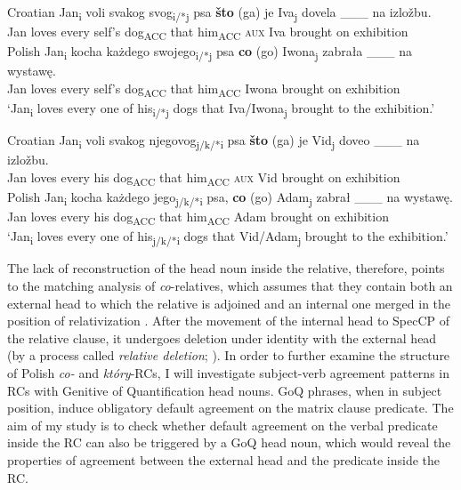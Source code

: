 \documentclass[output=paper]{langsci/langscibook}
\begin{document}
\ea%
    \label{ex:leska:15}
    \ea    Croatian
      \gll Jan\textsubscript{i} voli   svakog   svog\textsubscript{i/*j} psa   \textbf{što} (ga)   je   Iva\textsubscript{j} dovela \_\_\_ na izložbu. \\
           \textsubscript{} Jan   loves   every   self’s   dog\textsubscript{ACC}  that  him\textsubscript{ACC}  \textsc{aux}  Iva   brought on exhibition  \\
      \ex   Polish
      \gll  Jan\textsubscript{i} kocha   każdego   swojego\textsubscript{i/*j} psa   \textbf{co}   (go)   Iwona\textsubscript{j}    zabrała \_\_\_   na wystawę.       \\
            Jan   loves   every   self’s   dog\textsubscript{ACC}   that  him\textsubscript{ACC}  Iwona    brought   on exhibition         \\
      \glt  ‘Jan\textsubscript{i} loves every one of his\textsubscript{i/*j} dogs that Iva/Iwona\textsubscript{j} brought to the exhibition.’   
    \z
\z



\ea%
    \label{ex:leska:16}
    \ea  Croatian
    \gll Jan\textsubscript{i}  voli   svakog   njegovog\textsubscript{j/k/*i} psa   \textbf{što} (ga)   je   Vid\textsubscript{j}  doveo \_\_\_   na izložbu.   \\
         Jan   loves every   his   dog\textsubscript{ACC}  that him\textsubscript{ACC} \textsc{aux}  Vid                               brought   on exhibition \\
    \ex  Polish
    \gll Jan\textsubscript{i} kocha   każdego   jego\textsubscript{j/k/*i} psa,   \textbf{co}  (go)     Adam\textsubscript{j}   zabrał \_\_\_     na wystawę.\\
         Jan  loves   every   his   dog\textsubscript{ACC}  that  him\textsubscript{ACC}  Adam     brought   on exhibition    \\
    \glt ‘Jan\textsubscript{i} loves every one of his\textsubscript{j/k/*i} dogs that Vid/Adam\textsubscript{j} brought to the exhibition.’
    \z
\z

The lack of reconstruction of the head noun inside the relative, therefore, points to the matching analysis of \textit{co}{}-relatives, which assumes that they contain both an external head to which the relative is adjoined and an internal one merged in the position of relativization \citep{Bhatt2002,Sauerland2002,Hulsey2006}. After the movement of the internal head to SpecCP of the relative clause, it undergoes deletion under identity with the external head (by a process called \textit{relative deletion}; \citealt{Sauerland2002}). In order to further examine the structure of Polish \textit{co{}-} and \textit{który}{}-RCs, I will investigate subject-verb agreement patterns in RCs with Genitive of Quantification head nouns. GoQ phrases, when in subject position, induce obligatory default agreement on the matrix clause predicate. The aim of my study is to check whether default agreement on the verbal predicate inside the RC can also be triggered by a GoQ head noun, which would reveal the properties of agreement between the external head and the predicate inside the RC.
\end{document}
